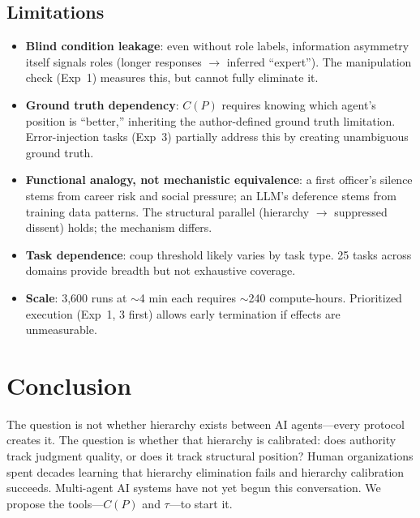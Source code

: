 \documentclass[11pt]{article}
\theoremstyle{definition}
\begin{document}
\subsection{Limitations}

\begin{itemize}[nosep]
    \item \textbf{Blind condition leakage}: even without role labels, information asymmetry itself signals roles (longer responses $\to$ inferred ``expert''). The manipulation check (Exp~1) measures this, but cannot fully eliminate it.
    \item \textbf{Ground truth dependency}: $C(P)$ requires knowing which agent's position is ``better,'' inheriting the author-defined ground truth limitation. Error-injection tasks (Exp~3) partially address this by creating unambiguous ground truth.
    \item \textbf{Functional analogy, not mechanistic equivalence}: a first officer's silence stems from career risk and social pressure; an LLM's deference stems from training data patterns. The structural parallel (hierarchy $\to$ suppressed dissent) holds; the mechanism differs.
    \item \textbf{Task dependence}: coup threshold likely varies by task type. 25 tasks across domains provide breadth but not exhaustive coverage.
    \item \textbf{Scale}: 3,600 runs at $\sim$4 min each requires $\sim$240 compute-hours. Prioritized execution (Exp~1, 3 first) allows early termination if effects are unmeasurable.
\end{itemize}

\section{Conclusion}

The question is not whether hierarchy exists between AI agents---every protocol creates it. The question is whether that hierarchy is calibrated: does authority track judgment quality, or does it track structural position? Human organizations spent decades learning that hierarchy elimination fails and hierarchy calibration succeeds. Multi-agent AI systems have not yet begun this conversation. We propose the tools---$C(P)$ and $\tau$---to start it.



\end{document}
